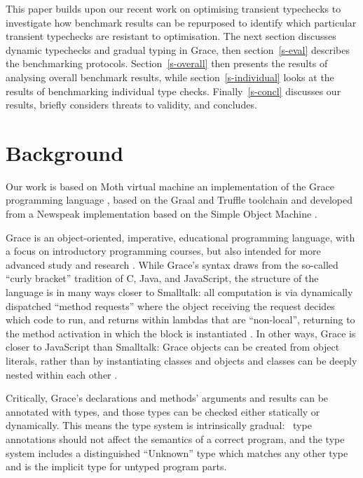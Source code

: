 \documentclass[sigplan,10pt,review,screen]{acmart}\settopmatter{printfolios=true}
\begin{document}
This paper builds upon our recent work on optimising transient
typechecks \cite{Roberts2017,roberts-and-co-ecoop-2019} to
investigate how benchmark results can be repurposed to identify which
particular transient typechecks are resistant to optimisation.
The next section discusses dynamic typechecks and gradual typing in
Grace, then section~\ref{s-eval} describes the benchmarking
protocols. Section~\ref{s-overall} then presents the results of
analysing overall benchmark results, while section~\ref{s-individual}
looks at the results of benchmarking individual type checks.
Finally~\ref{s-concl} discusses our results, briefly considers threats
to validity, and concludes.

\section{Background}
\label{s-bg}

Our work is based on Moth virtual machine 
\cite{Roberts2017,roberts-and-co-ecoop-2019}
an implementation
of the Grace programming language 
\citep{graceOnward12,graceSigcse13},
based on the Graal and Truffle toolchain
\cite{Wurthinger:2017:PPE,Wurthinger2013}
and developed from a Newspeak implementation based on the  Simple
Object Machine \cite{Daloze2016,SOMns}.

Grace is an object-oriented, imperative, educational programming
language, with a focus on introductory programming
courses, but also intended for more advanced study and research \citep{graceOnward12,graceSigcse13}.
%
While Grace's syntax draws
from the so-called ``curly bracket'' tradition of C, Java, and
JavaScript, the structure of the language
is in many ways closer to Smalltalk:
all computation is via dynamically dispatched  ``method requests''
where the object receiving the request decides which code to run,
and
%
returns within lambdas that are ``non-local'', returning to the method
activation in which the block is instantiated \citep{bluebook}.  In
other ways, Grace is closer to JavaScript than Smalltalk: Grace
objects can be created from object literals, rather than by
instantiating classes \citep{Black2007-emeraldHOPL,JonesECOOP2016} and
objects and classes can be deeply nested within each 
other \citep{betabook}.

Critically, Grace's declarations and methods' arguments
and results can be annotated with types, and those types can be  checked
either statically or dynamically. This means the type system is
intrinsically gradual:%
%
~type annotations should not affect the semantics of a correct
program\citep{XXXSiek2015}, and the type system
includes a distinguished ``{Unknown}'' type which matches any other type
and is the implicit type for untyped program parts.
\end{document}
